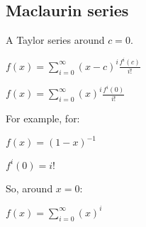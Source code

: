 
\subsection{Maclaurin series}

A Taylor series around \(c=0\).

\(f(x)=\sum_{i=0}^\infty (x-c)^i \frac{f^i(c)}{i!}\)

\(f(x)=\sum_{i=0}^\infty (x)^i \frac{f^i(0)}{i!}\)

For example, for:	   

\(f(x)=(1-x)^{-1}\)

\(f^i(0)=i!\)

So, around \(x=0\):

\(f(x)=\sum_{i=0}^\infty (x)^i\)

